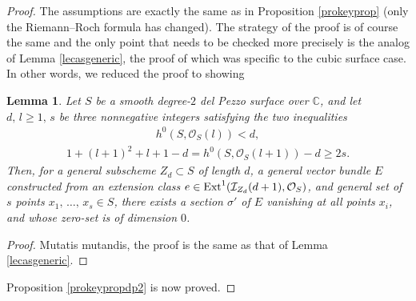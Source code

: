\documentclass[10pt]{article}
\newtheorem{lemm}[theo]{Lemma}
\begin{document}
\begin{proof} The assumptions are exactly the same as in Proposition \ref{prokeyprop} (only the Riemann--Roch formula has changed). The strategy of the proof is of course the same and the only point that needs to be checked more precisely is the analog of Lemma \ref{lecasgeneric}, the proof of which was specific to the  cubic surface case. In other words, we reduced the proof to showing
\begin{lemm} \label{lecasgenericdp2} Let $S$ be a smooth degree-$2$ del Pezzo  surface over $\mathbb{C}$, and let $d,\,l\geq 1,\,s$ be three nonnegative integers satisfying the two inequalities
\begin{eqnarray}\label{eqineqassumpdp2} h^0(S,\mathcal{O}_S(l))<d,\end{eqnarray}
\begin{eqnarray}\label{eqineqassump2dp2}1+(l+1)^2+l+1-d=h^0(S,\mathcal{O}_S(l+1))-d\geq 2s.
\end{eqnarray}
Then, for a general subscheme
$Z_d\subset S$ of length $d$, a general vector bundle $E$ constructed from an extension class $e\in {\rm Ext}^1(\mathcal{I}_{Z_d}(d+1),\mathcal{O}_S)$, and general set of $s$ points $x_1,\,\ldots,\,x_s\in S$, there exists a section $\sigma'$ of $E$ vanishing at all points  $x_i$, and whose zero-set is of dimension $0$.
\end{lemm}
\begin{proof} Mutatis mutandis, the proof is the same as that of Lemma \ref{lecasgeneric}.
\end{proof}
Proposition \ref{prokeypropdp2} is now proved.
\end{proof}
\end{document}
